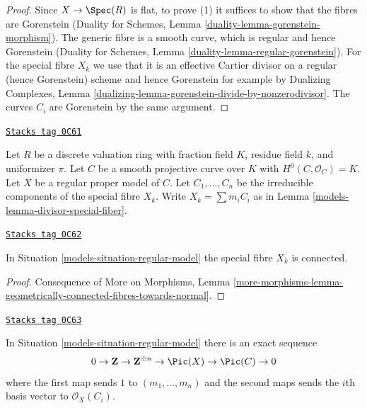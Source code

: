 \begin{proof}
Since $X \to \Spec(R)$ is flat, to prove (1)
it suffices to show that the fibres are Gorenstein
(Duality for Schemes, Lemma \ref{duality-lemma-gorenstein-morphism}).
The generic fibre is a smooth curve, which is regular and hence Gorenstein
(Duality for Schemes, Lemma \ref{duality-lemma-regular-gorenstein}).
For the special fibre $X_k$ we use that it is an effective
Cartier divisor on a regular (hence Gorenstein) scheme and hence
Gorenstein for example by Dualizing Complexes, Lemma
\ref{dualizing-lemma-gorenstein-divide-by-nonzerodivisor}.
The curves $C_i$ are Gorenstein by the same argument.
\end{proof}

\begin{definition}
\label{models-situation-regular-model}
\href{https://stacks.math.columbia.edu/tag/0C61}{\texttt{Stacks tag 0C61}}

Let $R$ be a discrete valuation ring with fraction field $K$,
residue field $k$, and uniformizer $\pi$.
Let $C$ be a smooth projective curve over $K$ with $H^0(C, \mathcal{O}_C) = K$.
Let $X$ be a regular proper model of $C$.
Let $C_1, \ldots, C_n$ be the irreducible components of the special
fibre $X_k$. Write $X_k = \sum m_i C_i$ as in
Lemma \ref{models-lemma-divisor-special-fiber}.
\end{definition}

\begin{lemma}
\label{models-lemma-regular-model-connected}
\href{https://stacks.math.columbia.edu/tag/0C62}{\texttt{Stacks tag 0C62}}

In Situation \ref{models-situation-regular-model} the special fibre $X_k$ is connected.
\end{lemma}

\begin{proof}
Consequence of More on Morphisms, Lemma
\ref{more-morphisms-lemma-geometrically-connected-fibres-towards-normal}.
\end{proof}

\begin{lemma}
\label{models-lemma-regular-model-pic}
\href{https://stacks.math.columbia.edu/tag/0C63}{\texttt{Stacks tag 0C63}}

In Situation \ref{models-situation-regular-model} there is an exact sequence
$$
0 \to \mathbf{Z} \to \mathbf{Z}^{\oplus n} \to
\Pic(X) \to \Pic(C) \to 0
$$
where the first map sends $1$ to $(m_1, \ldots, m_n)$ and the second
maps sends the $i$th basis vector to $\mathcal{O}_X(C_i)$.
\end{lemma}


